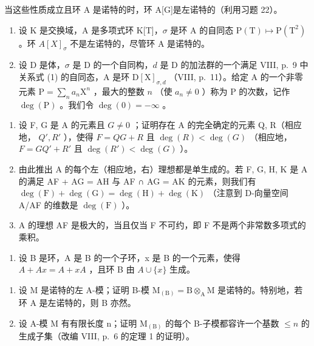 当这些性质成立且环 A 是诺特的时，环 A{[}G{]}是左诺特的（利用习题 22）。

\begin{enumerate}
\def\labelenumi{\arabic{enumi})}
\setcounter{enumi}{25}
\item
  设 K 是交换域，A 是多项式环 K{[}T{]}，\(\sigma\) 是环 A 的自同态 \(\mathrm{P(T)}\mapsto\mathrm{P(T^{2})}\) 。环 \(A[X]_{\sigma}\) 不是左诺特的，尽管环 A 是诺特的。
\item
  设 D 是体，\(\sigma\) 是 D 的一个自同构，\(d\) 是 D 的加法群的一个满足 VIII, p.~9 中关系式 (1) 的自同态，A 是环 \(\mathrm{D}[\mathrm{X}]_{\sigma,d}\) （VIII, p.~11）。给定 A 的一个非零元素 \(\mathrm{P} = \sum_{n}a_{n}\mathrm{X}^{n}\) ，最大的整数 \(n\) （使 \(a_{n}\neq 0\) ）称为 P 的次数，记作 \(\deg (\mathrm{P})\) 。我们令 \(\deg (0) = -\infty\) 。
\end{enumerate}

\begin{enumerate}
\def\labelenumi{\alph{enumi})}
\item
  设 F, G 是 A 的元素且 \(G \neq 0\) ；证明存在 A 的完全确定的元素 Q, R（相应地， \(Q', R'\) ），使得 \(F = QG + R\) 且 \(\deg(R) < \deg(G)\) （相应地， \(F = GQ' + R'\) 且 \(\deg(R') < \deg(G)\) ）。
\item
  由此推出 A 的每个左（相应地，右）理想都是单生成的。若 F, G, H, K 是 A 的满足 AF + AG = AH 与 AF ∩ AG = AK 的元素，则我们有 \(\deg(\mathrm{F}) + \deg(\mathrm{G}) = \deg(\mathrm{H}) + \deg(\mathrm{K})\) （注意到 D-向量空间 A/AF 的维数是 \(\deg(\mathrm{F})\) ）。
\item
  A 的理想 AF 是极大的，当且仅当 F 不可约，即 F 不是两个非常数多项式的乘积。
\end{enumerate}

\begin{enumerate}
\def\labelenumi{\arabic{enumi})}
\setcounter{enumi}{27}
\tightlist
\item
  设 B 是环，A 是 B 的一个子环，x 是 B 的一个元素，使得 \(A + Ax = A + xA\) ，且环 B 由 \(A \cup \{x\}\) 生成。
\end{enumerate}

\begin{enumerate}
\def\labelenumi{\alph{enumi})}
\item
  设 M 是诺特的左 A-模；证明 B-模 \(\mathrm{M}_{(\mathrm{B})} = \mathrm{B} \otimes_{\mathrm{A}} \mathrm{M}\) 是诺特的。特别地，若环 A 是左诺特的，则 B 亦然。
\item
  设 A-模 M 有有限长度 n；证明 \(\mathrm{M}_{(\mathrm{B})}\) 的每个 B-子模都容许一个基数 \(\leqslant n\) 的生成子集（改编 VIII, p.~6 的定理 1 的证明）。
\end{enumerate}

